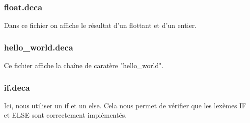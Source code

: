 \documentclass[12pt, a4paper, one side]{article}
\begin{document}
\subsubsection{float.deca}
Dans ce fichier on affiche le résultat d'un flottant et d'un entier.

\subsubsection{hello\_world.deca}
Ce fichier affiche la chaîne de caratère "hello\_world". 

\subsubsection{if.deca}
Ici, nous utiliser un if et un else. Cela nous permet de vérifier que les lexèmes IF et ELSE sont correctement implémentés.
\end{document}

